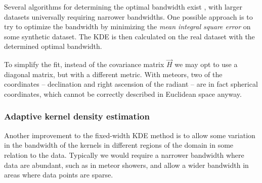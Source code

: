             Several algorithms for determining the optimal bandwidth exist \citep{bowman1985,jones+1996},
            with larger datasets universally requiring narrower bandwidths.
            One possible approach is to try to optimize the bandwidth by minimizing the
            \emph{mean integral square error} on some synthetic dataset.
            The KDE is then calculated on the real dataset with the determined optimal bandwidth.

            To simplify the fit, instead of the covariance matrix $\vec{H}$ we may opt to use a diagonal matrix,
            but with a different metric. With meteors, two of the coordinates -- declination
            and right ascension of the radiant -- are in fact spherical coordinates,
            which cannot be correctly described in Euclidean space anyway.

        \subsubsection{Adaptive kernel density estimation} \label{mmka}
            Another improvement to the fixed-width KDE method is to allow some variation in the bandwidth
            of the kernels in different regions of the domain in some relation to the data.
            Typically we would require a narrower bandwidth where data are abundant,
            such as in meteor showers, and allow a wider bandwidth in areas where data points are sparse.
